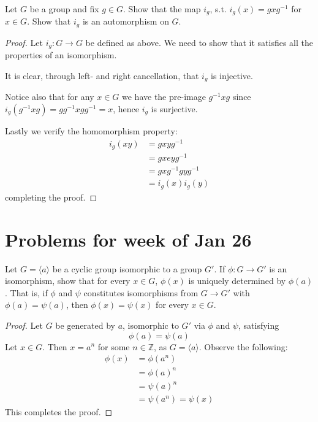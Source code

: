 \begin{prob}[41, p. 49]
    Let $G$ be a group and fix $g \in G$. Show that the map 
    $i_g$, s.t. $i_g(x) = gxg^{-1}$ for $x \in G$. Show that 
    $i_g$ is an automorphism on $G$.
\end{prob}
\begin{proof}
    Let $i_g : G \to G$ be defined as above. We need to show that 
    it satisfies all the properties of an isomorphism. 

    It is clear, through left- and right cancellation, that 
    $i_g$ is injective. 

    Notice also that for any $x \in G$ we have the pre-image 
    $g^{-1}xg$ since $i_g(g^{-1}xg) = gg^{-1}xgg^{-1} = x$, hence 
    $i_g$ is surjective. 

    Lastly we verify the homomorphism property: 
    \begin{align*}
        i_g(xy) &= gxyg^{-1} \\ 
                &= gxeyg^{-1} \\ 
                &= gxg^{-1}gyg^{-1} \\ 
                &= i_g(x) i_g(y)
    \end{align*}
    completing the proof. 
\end{proof}

\newpage 
\section{Problems for week of Jan 26}
\begin{prob}
    Let $G = \langle a \rangle$ be a cyclic group isomorphic 
    to a group $G'$. 
    If $\phi : G \to G'$ is an isomorphism, show that 
    for every $x \in G$, $\phi(x)$ is uniquely determined by $\phi(a)$.
    That is, if $\phi$ and $\psi$ constitutes isomorphisms from 
    $G \to G'$ with $\phi(a) = \psi(a)$, then $\phi(x) = \psi(x)$ 
    for every $x \in G$.
\end{prob}
\begin{proof}
    Let $G$ be generated by $a$, isomorphic to $G'$ via 
    $\phi$ and $\psi$, satisfying  
    \[
        \phi(a) = \psi(a)
    \]
    Let $x \in G$. Then $x = a^n$ for some $n \in \mathbb Z$, as 
    $G = \langle a \rangle$. 
    Observe the following:
    \begin{align*}
        \phi(x) &= \phi(a^n) \\ 
                &= \phi(a)^n \\ 
                &= \psi(a)^n \\ 
                &= \psi(a^n) = \psi(x)
    \end{align*}
    This completes the proof.
\end{proof}

